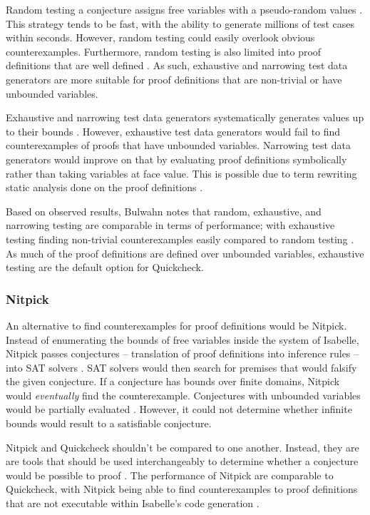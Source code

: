 Random testing a conjecture assigns free variables with a pseudo-random values \cite[Sec. 3.1]{isabelleQuickcheck}. This strategy tends to be fast, 
with the ability to generate millions of test cases within seconds. However, random testing could easily overlook obvious counterexamples. 
Furthermore, random testing is also limited into proof definitions that are well defined \cite{isabelleQuickcheck}. As such, exhaustive and narrowing 
test data generators are more suitable for proof definitions that are non-trivial or have unbounded variables.

Exhaustive and narrowing test data generators systematically generates values up to their bounds \cite{isabelleQuickcheck}. 
However, exhaustive test data generators would fail to find counterexamples of proofs that have unbounded variables. Narrowing test data generators 
would improve on that by evaluating proof definitions symbolically rather than taking variables at face value. This is possible due to 
term rewriting static analysis done on the proof definitions \cite[Sec. 5]{isabelleQuickcheck}.

Based on observed results, Bulwahn notes that random, exhaustive, and narrowing testing are comparable in terms of performance; with 
exhaustive testing finding non-trivial counterexamples easily compared to random testing \cite[Sec. 7]{isabelleQuickcheck}. As much of the 
proof definitions are defined over unbounded variables, exhaustive testing are the default option for Quickcheck.

\subsubsection{Nitpick}
\label{sec:Nitpick}

An alternative to find counterexamples for proof definitions would be Nitpick. Instead of enumerating the bounds of free variables inside the 
system of Isabelle, Nitpick passes conjectures -- translation of proof definitions into inference rules -- into SAT solvers 
\cite[Sec. 5]{isabelleProof}. SAT solvers would then search for premises that would falsify the given conjecture. If a conjecture 
has bounds over finite domains, Nitpick would \emph{eventually} find the counterexample. Conjectures with unbounded variables would be partially 
evaluated \cite[Sec. 5.2]{isabelleProof}. However, it could not determine whether infinite bounds would result to a satisfiable conjecture.

Nitpick and Quickcheck shouldn't be compared to one another. Instead, they are are tools that should be used interchangeably to determine 
whether a conjecture would be possible to proof \cite{isabelleQuickcheck}. The performance of Nitpick are comparable to Quickcheck, with 
Nitpick being able to find counterexamples to proof definitions that are not executable within Isabelle's code generation 
\cite[Sec. 7]{isabelleQuickcheck}.

